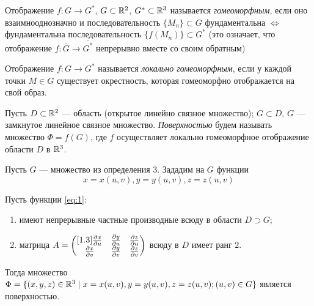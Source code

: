 \documentclass[a4paper,10pt]{article}
\begin{document}
	
	\jeolmnewheader
	
	\begin{defn}
		Отображение $f : G \to G^*$, $G \subset {\mathbb R}^2$, $G^* \subset {\mathbb R}^3$ называется \textit{гомеоморфным}, если оно взаимнооднозначно и последовательность $\{M_n\} \subset G$ фундаментальна $\Leftrightarrow$ фундаментальна последовательность $\{f(M_n)\} \subset G^*$ (это означает, что отображение $f:\overline{G} \to \overline{G^*}$ непрерывно вместе со своим обратным)
	\end{defn}

	\begin{defn}
		Отображение $f : G \to G^*$ называется \textit{локально гомеоморфным}, если у каждой точки $M \in G$ существует окрестность, которая гомеоморфно отображается на свой образ.
	\end{defn}
	
	\begin{defn}\label{def:3}
		Пусть $D \subset {\mathbb R}^2$ --- область (открытое линейно связное множество); $G \subset D$, $G$ --- замкнутое линейное связное множество. \textit{Поверхностью} будем называть множество $\Phi = f(G)$, где $f$ осуществляет локально гомеоморфное отображение области $D$ в ${\mathbb R}^3$.
	\end{defn}

	Пусть $G$ --- множество из определения $3$. Зададим на $G$ функции 
	\begin{equation}\label{eq:1}
		x = x(u, v), y = y(u, v), z = z(u, v)
	\end{equation}
	
	\begin{thm}
		Пусть функции \eqref{eq:1}:
		\begin{enumerate}[label=\arabic*)]
			\item\label{uslovie:1} имеют непрерывные частные производные всюду в области $D \supset G$;
			\item\label{uslovie:2} матрица $A=\left(\begin{matrix}[1.3]
			\frac{\partial x}{\partial u} & \frac{\partial y}{\partial u} & \frac{\partial z}{\partial u} \\
			\frac{\partial x}{\partial v} & \frac{\partial y}{\partial v} & \frac{\partial z}{\partial v}
			\end{matrix}\right)$ всюду в $D$ имеет ранг $2$.
		\end{enumerate}
		Тогда множество $\Phi = \{(x, y, z) \in {\mathbb R}^3 \mid x = x(u, v), y = y(u, v), z = z(u, v); (u, v) \in G \}$ является поверхностью.
	\end{thm}
\end{document}
